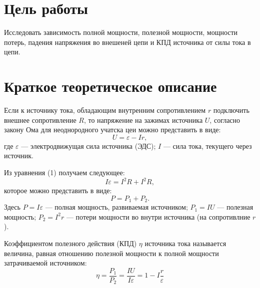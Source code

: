 \documentclass[12pt]{article}
\begin{document}
\section*{Цель работы}
Исследовать зависимость полной мощности, полезной мощности, мощности потерь, падения напряжения во внешеней цепи и КПД источника от силы тока в цепи. 
\section*{Краткое теоретическое описание}
Если к источнику тока, обладающим внутренним сопротивлением $r$ подключить внешнее сопротивление $R$, то напряжение на зажимах источника $U$, согласно закону Ома для неоднородного учатска цеи можно представить в виде:
\begin{equation}
U = \varepsilon -Ir,
\end{equation}
где $\varepsilon$ --- электродвижущая сила источника (ЭДС); $I$ --- сила тока, текущего через источник.

Из уравнения (1) получаем следующее: 
\begin{equation}
I\varepsilon=I^2R + I^2R,
\end{equation}
которое можно представить в виде:
\begin{equation}
P=P_1+P_2.
\end{equation}
Здесь $P=I\varepsilon$ --- полная мощность, развиваемая источником; $P_1 = IU$ --- полезная мощность; $P_2 = I^2r$ --- потери мощности во внутри источника (на сопротивлние $r$).

Коэффициентом полезного действия (КПД) $\eta$ источника тока называется величина, равная отношению полезной мощности к полной мощности затрачиваемой источником:
\begin{equation}
\eta = \frac{P_1}{P_2} = \frac{IU}{I\varepsilon} = 1 - I\frac{r}{\varepsilon}
\end{equation}
\end{document}
